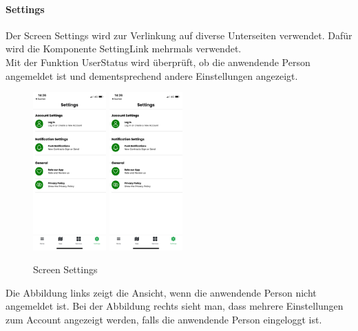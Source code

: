 \paragraph{Settings}Der Screen Settings wird zur Verlinkung auf diverse Unterseiten verwendet. Dafür wird die Komponente SettingLink mehrmals verwendet.\\
Mit der Funktion UserStatus wird überprüft, ob die anwendende Person angemeldet ist und dementsprechend andere Einstellungen angezeigt. \\
\begin{figure}[H]
    \centering
    \includegraphics[width=0.25\textwidth]{images/app-screenshots/screensettingsa.png}
    \includegraphics[width=0.25\textwidth]{images/app-screenshots/screensettingsa.png}
    \caption{Screen Settings}
    \label{fig:screensettings}
\end{figure}
Die Abbildung links zeigt die Ansicht, wenn die anwendende Person nicht angemeldet ist. Bei der Abbildung rechts sieht man, dass mehrere Einstellungen zum Account angezeigt werden, falls die anwendende Person eingeloggt ist. \\


